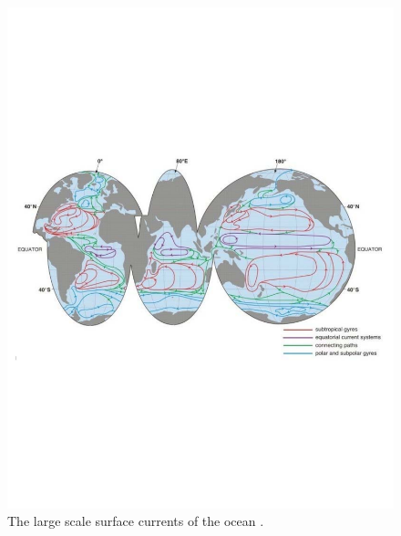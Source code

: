 \begin{figure}%
  \begin{center}
    \includegraphics[scale=0.7]{Figures/WindDrivenCurrents.pdf}%
    \caption{The large scale surface currents of the ocean \cite{Haidvogel1999}.}
    \label{fig:Currents}
  \end{center}
\end{figure}


